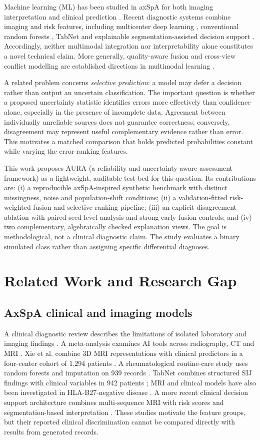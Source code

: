\documentclass[conference]{IEEEtran}
\begin{document}
Machine learning (ML) has been studied in axSpA for both imaging interpretation and clinical prediction \cite{adams,meta}. Recent diagnostic systems combine imaging and risk features, including multicenter deep learning \cite{xie}, conventional random forests \cite{rf}, TabNet \cite{tabnet} and explainable segmentation-assisted decision support \cite{cdss}. Accordingly, neither multimodal integration nor interpretability alone constitutes a novel technical claim. More generally, quality-aware fusion and cross-view conflict modelling are established directions in multimodal learning \cite{tmc,qamoe,aemrl}.

A related problem concerns \emph{selective prediction}: a model may defer a decision rather than output an uncertain classification. The important question is whether a proposed uncertainty statistic identifies errors more effectively than confidence alone, especially in the presence of incomplete data. Agreement between individually unreliable sources does not guarantee correctness; conversely, disagreement may represent useful complementary evidence rather than error. This motivates a matched comparison that holds predicted probabilities constant while varying the error-ranking features.

This work proposes AURA (a reliability and uncertainty-aware assessment framework) as a lightweight, auditable test bed for this question. Its contributions are: (i) a reproducible axSpA-inspired synthetic benchmark with distinct missingness, noise and population-shift conditions; (ii) a validation-fitted risk-weighted fusion and selective ranking pipeline; (iii) an explicit disagreement ablation with paired seed-level analysis and strong early-fusion controls; and (iv) two complementary, algebraically checked explanation views. The goal is methodological, not a clinical diagnostic claim. The study evaluates a binary simulated class rather than assigning specific differential diagnoses.
\section{Related Work and Research Gap}
\subsection{AxSpA clinical and imaging models}
A clinical diagnostic review describes the limitations of isolated laboratory and imaging findings \cite{clinical}. A meta-analysis examines AI tools across radiography, CT and MRI \cite{meta}. Xie et al. combine 3D MRI representations with clinical predictors in a four-center cohort of 1,294 patients \cite{xie}. A rheumatological routine-care study uses random forests and imputation on 939 records \cite{rf}. TabNet combines structured SIJ findings with clinical variables in 942 patients \cite{tabnet}; MRI and clinical models have also been investigated in HLA-B27-negative disease \cite{negative}. A more recent clinical decision support architecture combines multi-sequence MRI with risk scores and segmentation-based interpretation \cite{cdss}. These studies motivate the feature groups, but their reported clinical discrimination cannot be compared directly with results from generated records.
\end{document}
